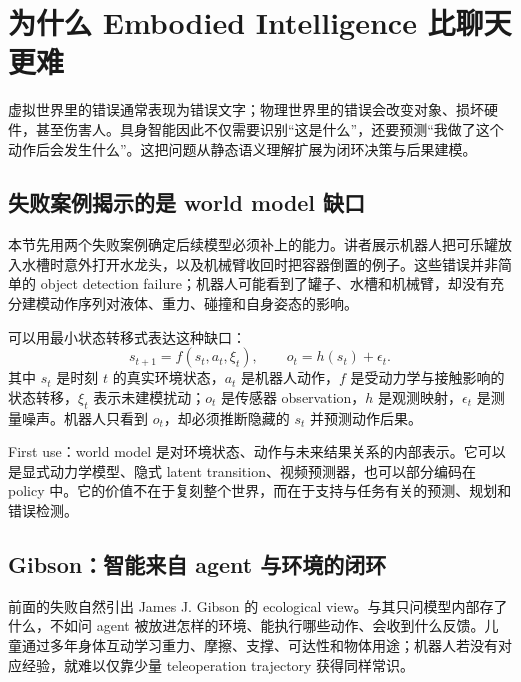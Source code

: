 \section{为什么 Embodied Intelligence 比聊天更难}

虚拟世界里的错误通常表现为错误文字；物理世界里的错误会改变对象、损坏硬件，甚至伤害人。具身智能因此不仅需要识别“这是什么”，还要预测“我做了这个动作后会发生什么”。这把问题从静态语义理解扩展为闭环决策与后果建模。

\subsection{失败案例揭示的是 world model 缺口}

本节先用两个失败案例确定后续模型必须补上的能力。讲者展示机器人把可乐罐放入水槽时意外打开水龙头，以及机械臂收回时把容器倒置的例子。这些错误并非简单的 object detection failure；机器人可能看到了罐子、水槽和机械臂，却没有充分建模动作序列对液体、重力、碰撞和自身姿态的影响。


可以用最小状态转移式表达这种缺口：
$$
s_{t+1}=f(s_t,a_t,\xi_t),\qquad o_t=h(s_t)+\epsilon_t.
$$
其中 $s_t$ 是时刻 $t$ 的真实环境状态，$a_t$ 是机器人动作，$f$ 是受动力学与接触影响的状态转移，$\xi_t$ 表示未建模扰动；$o_t$ 是传感器 observation，$h$ 是观测映射，$\epsilon_t$ 是测量噪声。机器人只看到 $o_t$，却必须推断隐藏的 $s_t$ 并预测动作后果。

\begin{knowledgebox}{First use：world model}
是对环境状态、动作与未来结果关系的内部表示。它可以是显式动力学模型、隐式 latent transition、视频预测器，也可以部分编码在 policy 中。它的价值不在于复刻整个世界，而在于支持与任务有关的预测、规划和错误检测。
\end{knowledgebox}


\subsection{Gibson：智能来自 agent 与环境的闭环}

前面的失败自然引出 James J. Gibson 的 ecological view。与其只问模型内部存了什么，不如问 agent 被放进怎样的环境、能执行哪些动作、会收到什么反馈。儿童通过多年身体互动学习重力、摩擦、支撑、可达性和物体用途；机器人若没有对应经验，就难以仅靠少量 teleoperation trajectory 获得同样常识。

